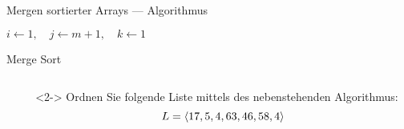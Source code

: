 \begin{frame}{Mergen sortierter Arrays --- Algorithmus}
\begin{algorithm}[H]
	\caption{Merge}
	\label{sort:alg:merge}
	\DontPrintSemicolon
    \BlankLine
    \begin{multicols}{2}
    $i \gets 1, \quad j \gets m + 1, \quad k \gets 1$\;
    \;
    \end{multicols}
\end{algorithm}
\end{frame}

\begin{frame}{Merge Sort}
\begin{columns}[T,onlytextwidth]
\begin{column}{0.42\textwidth}
\begin{algorithm}[H]
	\caption{Merge Sort}
	\label{sort:alg:mergesort}
	\DontPrintSemicolon
    \;
\end{algorithm}
\end{column}
\begin{column}{0.53\textwidth}
\begin{task}<2->
Ordnen Sie folgende Liste mittels des nebenstehenden Algorithmus: $$L = \langle17, 5, 4, 63, 46, 58, 4\rangle$$
\end{task}

\end{column}
\end{columns}
\end{frame}

